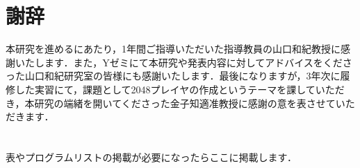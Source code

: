 \documentclass{suribt}
\begin{document}
\backmatter
\chapter{謝辞}
本研究を進めるにあたり，1年間ご指導いただいた指導教員の山口和紀教授に感謝いたします．また，Yゼミにて本研究や発表内容に対してアドバイスをくださった山口和紀研究室の皆様にも感謝いたします．最後になりますが，3年次に履修した実習にて，課題として2048プレイヤの作成というテーマを課していただき，本研究の端緒を開いてくださった金子知適准教授に感謝の意を表させていただきます．

\begin{thebibliography}{}
 \bibitem{}
 \bibitem{}
\end{thebibliography}

\appendix
\chapter{}
表やプログラムリストの掲載が必要になったらここに掲載します．
\end{document}
